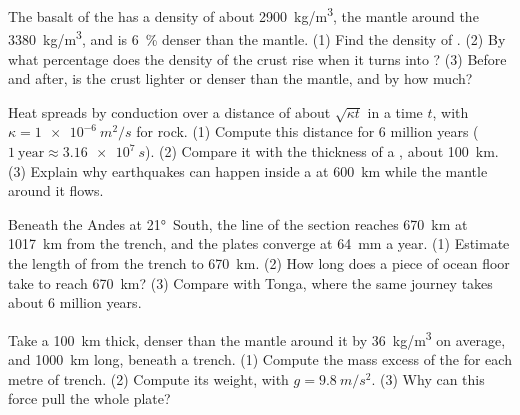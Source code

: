 \begin{exercise}[$\star\star$]\label{exo:g11:subduction-zones:11}
The basalt of the  has a density of about \qty{2900}{kg/m^3},
the mantle around the  \qty{3380}{kg/m^3}, and  is
\qty{6}{\percent} denser than the mantle. (1) Find the density of .
(2) By what percentage does the density of the crust rise when it turns into
? (3) Before and after, is the crust lighter or denser than the
mantle, and by how much?
\end{exercise}

\begin{exercise}[$\star\star\star$]\label{exo:g11:subduction-zones:12}
Heat spreads by conduction over a distance of about $\sqrt{\kappa t}$ in a
time $t$, with $\kappa = \qty{1e-6}{m^2/s}$ for rock. (1) Compute this distance
for 6 million years ($1~\text{year} \approx \qty{3.16e7}{s}$). (2) Compare it
with the thickness of a , about \qty{100}{km}. (3) Explain why
earthquakes can happen inside a  at \qty{600}{km} while the mantle around
it flows.
\end{exercise}

\begin{exercise}[$\star\star\star$]\label{exo:g11:subduction-zones:13}
Beneath the Andes at \ang{21}~South, the line of the section reaches
\qty{670}{km} at \qty{1017}{km} from the trench, and the plates converge at
\qty{64}{mm} a year. (1) Estimate the length of  from the trench to
\qty{670}{km}. (2) How long does a piece of ocean floor take to reach
\qty{670}{km}? (3) Compare with Tonga, where the same journey takes about 6
million years.
\end{exercise}

\begin{exercise}[$\star\star\star$]\label{exo:g11:subduction-zones:14}
Take a  \qty{100}{km} thick, denser than the mantle around it by
\qty{36}{kg/m^3} on average, and \qty{1000}{km} long, beneath a trench.
(1) Compute the mass excess of the  for each metre of trench. (2) Compute
its weight, with $g = \qty{9.8}{m/s^2}$. (3) Why can this force pull the whole
plate?
\end{exercise}

